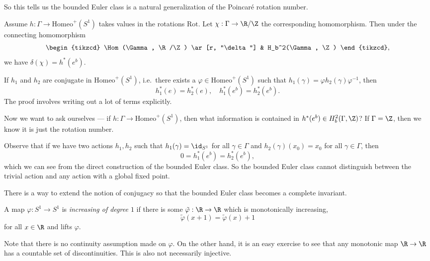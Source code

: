 \documentclass[a4paper]{article}
\newcommand\Homeo{\mathrm{Homeo}}
\newcommand\Rot{\mathrm{Rot}}
\begin{document}
So this tells us the bounded Euler class is a natural generalization of the Poincar\'e rotation number.

\begin{ex}
  Assume $h: \Gamma \to \Homeo^+(S^1)$ takes values in the rotations $\Rot$. Let $\chi: \Gamma \to \R/\Z$ the corresponding homomorphism. Then under the connecting homomorphism
  \[
    \begin{tikzcd}
      \Hom(\Gamma, \R/\Z) \ar[r, "\delta"] & H_b^2(\Gamma, \Z)
    \end{tikzcd},
  \]
  we have $\delta(\chi) = h^*(e^b)$.
\end{ex}

\begin{ex}
  If $h_1$ and $h_2$ are conjugate in $\Homeo^+(S^1)$, i.e.\ there exists a $\varphi \in \Homeo^+(S^1)$ such that $h_1(\gamma) = \varphi h_2(\gamma) \varphi^{-1}$, then
  \[
    h_1^*(e) = h_2^*(e),\quad h_1^*(e^b) = h_2^*(e^b).
  \]
  The proof involves writing out a lot of terms explicitly.
\end{ex}

Now we want to ask ourselves --- if $h: \Gamma \to \Homeo^+(S^1)$, then what information is contained in $h^*(e^b) \in H_b^2(\Gamma, \Z)$? If $\Gamma = \Z$, then we know it is just the rotation number.

Observe that if we have two actions $h_1, h_2$ such that $h_1(\gamma) = \id_{S^1}$ for all $\gamma \in \Gamma$ and $h_2(\gamma)(x_0) = x_0$ for all $\gamma \in \Gamma$, then %
\[
  0 = h_1^*(e^b) = h_2^*(e^b),
\]
which we can see from the direct construction of the bounded Euler class. So the bounded Euler class cannot distinguish between the trivial action and any action with a global fixed point.

There is a way to extend the notion of conjugacy so that the bounded Euler class becomes a complete invariant.

\begin{defi}
  A map $\varphi: S^1 \to S^1$ is \emph{increasing of degree $1$} if there is some $\tilde{\varphi}: \R \to \R$ which is monotonically increasing,
  \[
    \tilde{\varphi}(x + 1) = \tilde{\varphi}(x) + 1
  \]
  for all $x \in \R$ and lifts $\varphi$.
\end{defi}
Note that there is no continuity assumption made on $\varphi$. On the other hand, it is an easy exercise to see that any monotonic map $\R \to \R$ has a countable set of discontinuities. This is also not necessarily injective.
\end{document}
